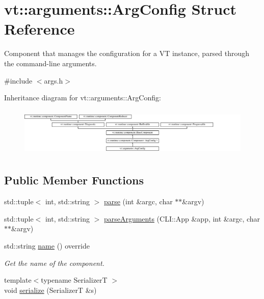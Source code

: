 \hypertarget{structvt_1_1arguments_1_1_arg_config}{}\section{vt\+:\+:arguments\+:\+:Arg\+Config Struct Reference}
\label{structvt_1_1arguments_1_1_arg_config}


Component that manages the configuration for a VT instance, parsed through the command-\/line arguments.  




{\ttfamily \#include $<$args.\+h$>$}

Inheritance diagram for vt\+:\+:arguments\+:\+:Arg\+Config\+:\begin{figure}[H]
\begin{center}
\leavevmode
\includegraphics[height=2.372881cm]{structvt_1_1arguments_1_1_arg_config}
\end{center}
\end{figure}
\subsection*{Public Member Functions}
\begin{DoxyCompactItemize}
\item 
std\+::tuple$<$ int, std\+::string $>$ \hyperlink{structvt_1_1arguments_1_1_arg_config_a124125d908a910cf52c6c59a3f0f2713}{parse} (int \&argc, char $\ast$$\ast$\&argv)
\item 
std\+::tuple$<$ int, std\+::string $>$ \hyperlink{structvt_1_1arguments_1_1_arg_config_ac6711ab96113f032b9e0a0b12d24eda3}{parse\+Arguments} (C\+L\+I\+::\+App \&app, int \&argc, char $\ast$$\ast$\&argv)
\item 
std\+::string \hyperlink{structvt_1_1arguments_1_1_arg_config_ade5e5994235f0953970fc3f460f9167a}{name} () override
\begin{DoxyCompactList}\small\item\em Get the name of the component. \end{DoxyCompactList}\item 
{\footnotesize template$<$typename SerializerT $>$ }\\void \hyperlink{structvt_1_1arguments_1_1_arg_config_a518d54185e265211ff1ed9aac08a868d}{serialize} (SerializerT \&s)
\end{DoxyCompactItemize}
